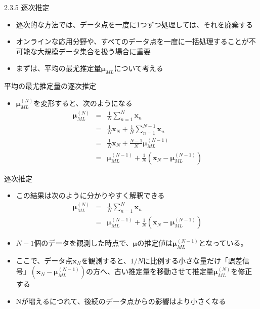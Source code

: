 \begin{frame}{2.3.5 逐次推定}
 \begin{itemize}
  \item 逐次的な方法では、データ点を一度に1つずつ処理しては、それを廃棄する
  \item オンラインな応用分野や、すべてのデータ点を一度に一括処理することが不可能な大規模データ集合を扱う場合に重要
  \item まずは、平均の最尤推定量$\bm{\mu}_{ML}$について考える
 \end{itemize}
\end{frame}

\begin{frame}{平均の最尤推定量の逐次推定}
 \begin{itemize}
  \item $\bm{\mu}_{ML}^{(N)}$を変形すると、次のようになる
        \begin{eqnarray}
         \bm{\mu}_{ML}^{(N)} &= &\frac{1}{N}\sum_{n=1}^{N}\bm{x}_n \nonumber \\
         & =& \frac{1}{N}\bm{x}_N+\frac{1}{N}\sum_{n=1}^{N-1}\bm{x}_n \nonumber \\
         & =& \frac{1}{N}\bm{x}_N + \frac{N-1}{N}\bm{\mu}_{ML}^{(N-1)}\nonumber \\
         & =& \bm{\mu}_{ML}^{(N-1)} +\frac{1}{N} (\bm{x}_N-\bm{\mu}_{ML}^{(N-1)})\label{162008_21Nov14}
        \end{eqnarray}
 \end{itemize}
\end{frame}

\begin{frame}{逐次推定}
 \begin{itemize}
  \item この結果は次のように分かりやすく解釈できる
        \begin{eqnarray}
         \bm{\mu}_{ML}^{(N)} &= &\frac{1}{N}\sum_{n=1}^{N}\bm{x}_n \\
         & =& \bm{\mu}_{ML}^{(N-1)} +\frac{1}{N} (\bm{x}_N-\bm{\mu}_{ML}^{(N-1)})
        \end{eqnarray}
  \item $N-1$個のデータを観測した時点で、$\bm{\mu}$の推定値は$\bm{\mu}_{ML}^{(N-1)}$となっている。
  \item ここで、データ点$\bm{x}_N$を観測すると、$1/N$に比例する小さな量だけ「誤差信号」$(\bm{x}_N-\bm{\mu}_{ML}^{(N-1)})$の方へ、古い推定量を移動させて推定量$\bm{\mu}_{ML}^{(N)}$を修正する
  \item Nが増えるにつれて、後続のデータ点からの影響はより小さくなる
 \end{itemize}
\end{frame}

